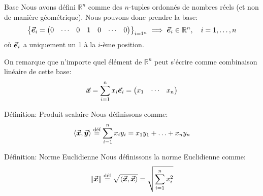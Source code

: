 \documentclass[a4paper]{article}
\begin{document}
\begin{parag}{Base}
    Nous avons défini $\mathbb{R}^n$ comme des $n$-tuples ordonnés de nombres réels (et non de manière géométrique). Nous pouvons donc prendre la base: 
    \[\left\{\bvec{e}_i = \begin{pmatrix} 0 & \cdots & 0 & 1 & 0 & \cdots & 0 \end{pmatrix} \right\}_{i=1^n} \implies \bvec{e}_i \in \mathbb{R}^{n}, \mathspace i = 1, \ldots, n\]
    où $\bm{\protect\vec{e}}_i$ a uniquement un 1 à la $i$-ème position.

    On remarque que n'importe quel élément de $\mathbb{R}^n$ peut s'écrire comme combinaison linéaire de cette base: 
    \[\bm{\protect\vec{x}} = \sum_{i=1}^{n} x_i \bm{\protect\vec{e}}_i = \begin{pmatrix} x_1 & \cdots & x_n \end{pmatrix} \]
\end{parag}

\begin{parag}{Définition: Produit scalaire}
    Nous définissons  comme: 
    \[\left<\bvec{x}, \bvec{y}\right> \over{=}{déf} \sum_{i=1}^{n}  x_i y_i = x_1 y_1 + \ldots + x_n y_n \]
\end{parag}

\begin{parag}{Définition: Norme Euclidienne}
    Nous définissons la norme Euclidienne comme: 
    \[\left\|\bvec{x}\right\| \over{=}{déf} \sqrt{\left<\bvec{x}, \bvec{x}\right>} = \sqrt{\sum_{i=1}^{n} x_i^2}\]
    
\end{parag}
\end{document}
